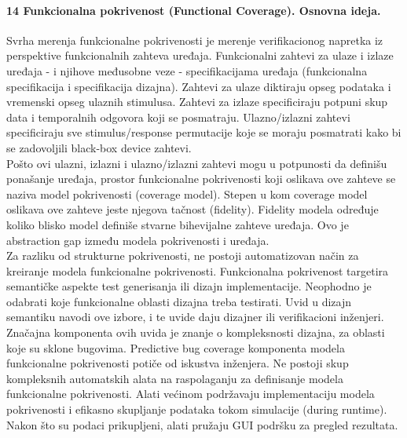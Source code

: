 \documentclass[a4paper, 12pt]{article}
\begin{document}
\paragraph{14 Funkcionalna pokrivenost (Functional Coverage). Osnovna ideja.}
\hfill \break
\indent Svrha merenja funkcionalne pokrivenosti je merenje verifikacionog napretka iz perspektive funkcionalnih zahteva uređaja. Funkcionalni zahtevi za ulaze i izlaze uređaja - i njihove međusobne veze - specifikacijama uređaja (funkcionalna specifikacija i specifikacija dizajna). Zahtevi za ulaze diktiraju opseg podataka i vremenski opseg ulaznih stimulusa. Zahtevi za izlaze specificiraju potpuni skup data i temporalnih odgovora koji se posmatraju. Ulazno/izlazni zahtevi specificiraju sve stimulus/response permutacije koje se moraju posmatrati kako bi se zadovoljili black-box device zahtevi.\\
\indent Pošto ovi ulazni, izlazni i ulazno/izlazni zahtevi mogu u potpunosti da definišu ponašanje uređaja, prostor funkcionalne pokrivenosti koji oslikava ove zahteve se naziva model pokrivenosti (coverage model). Stepen u kom coverage model oslikava ove zahteve jeste njegova tačnost (fidelity). Fidelity modela određuje koliko blisko model definiše stvarne bihevijalne zahteve uređaja. Ovo je abstraction gap između modela pokrivenosti i uređaja.\\
\indent Za razliku od strukturne pokrivenosti, ne postoji automatizovan način za kreiranje modela funkcionalne pokrivenosti. Funkcionalna pokrivenost targetira semantičke aspekte test generisanja ili dizajn implementacije. Neophodno je odabrati koje funkcionalne oblasti dizajna treba testirati. Uvid u dizajn semantiku navodi ove izbore, i te uvide daju dizajner ili verifikacioni inženjeri.\\
\indent Značajna komponenta ovih uvida je znanje o kompleksnosti dizajna, za oblasti koje su sklone bugovima. Predictive bug coverage komponenta modela funkcionalne pokrivenosti potiče od iskustva inženjera. Ne postoji skup kompleksnih automatskih alata na raspolaganju za definisanje modela funkcionalne pokrivenosti. Alati većinom podržavaju implementaciju modela pokrivenosti i efikasno skupljanje podataka tokom simulacije (during runtime). Nakon što su podaci prikupljeni, alati pružaju GUI podršku za pregled rezultata.
\end{document}
